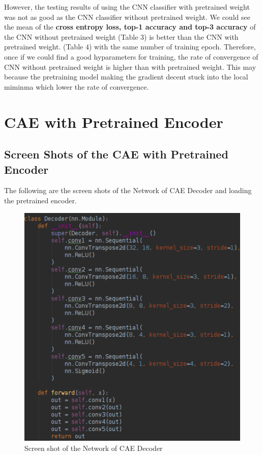\documentclass{article}
\begin{document}
However, the testing results of using the CNN classifier with pretrained weight was not as good as the CNN classifier without pretrained weight. We could see the mean of the \textbf{cross entropy loss, top-1 accuracy and top-3 accuracy} of the CNN without pretrained weight (Table $3$) is better than the CNN with pretrained weight. (Table $4$) with the same number of training epoch. Therefore, once if we could find a good hyparameters for training, the rate of convergence of CNN without pretrained weight is higher than with pretrained weight. This may because the pretraining model making the gradient decent stuck into the local miminma which lower the rate of convergence.



\pagebreak

\section{CAE with Pretrained Encoder}

\subsection{Screen Shots of the CAE with Pretrained Encoder}
The following are the screen shots of the Network of CAE Decoder and loading the pretrained encoder.

\begin{figure}[h]
  \centering
  \includegraphics[scale=1]{decoder.png}
  \caption{Screen shot of the Network of CAE Decoder}
\end{figure}
\end{document}

